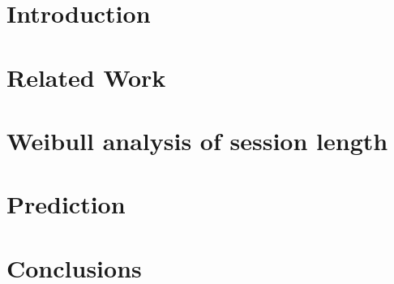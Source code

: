 \documentclass[sigconf]{acmart}
\begin{document}
\maketitle


\section{Introduction}
\label{sec:introduction}



\section{Related Work}
\label{sec:related}


\section{Weibull analysis of session length}
\label{sec:weibull}


\section{Prediction}
\label{sec:prediction}


\section{Conclusions}
\label{sec:conclusions}



%


\end{document}
